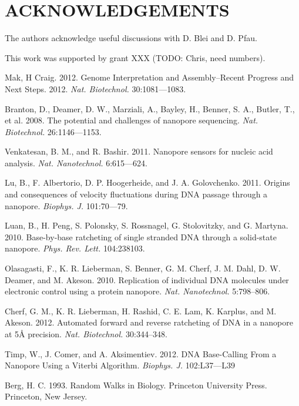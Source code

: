\documentclass{biophys_letter}
\begin{document}
\section*{ACKNOWLEDGEMENTS}

The authors acknowledge useful discussions with D. Blei and D. Pfau.

This work was supported by grant XXX (TODO: Chris, need numbers).

\begin{thebibliography}{99}

  Mak, H Craig. 
  2012.
  Genome Interpretation and Assembly--Recent Progress and Next Steps.
  2012.
  {\it Nat. Biotechnol.}
  30:1081---1083.

  Branton, D., Deamer, D. W., Marziali, A., Bayley, H., Benner, S. A., Butler, T., et al.
  2008.
  The potential and challenges of nanopore sequencing.
  {\it Nat. Biotechnol.}
  26:1146---1153.

  Venkatesan, B. M., and R. Bashir.
  2011.
  Nanopore sensors for nucleic acid analysis.
  {\it Nat. Nanotechnol.}
  6:615---624.

  Lu, B., F. Albertorio, D. P. Hoogerheide, and J. A. Golovchenko.
  2011.
  Origins and consequences of velocity fluctuations during DNA passage through a nanopore.
  {\it Biophys. J.}
  101:70---79.

  Luan, B., H. Peng, S. Polonsky, S. Rossnagel, G. Stolovitzky, and G. Martyna.
  2010.
  Base-by-base ratcheting of single stranded DNA through a solid-state nanopore.
  {\it Phys. Rev. Lett.}
  104:238103.

  Olasagasti, F., K. R. Lieberman, S. Benner, G. M. Cherf, J. M. Dahl, D. W. Deamer, and M. Akeson.
  2010.
  Replication of individual DNA molecules under electronic control using a protein nanopore.
  {\it Nat. Nanotechnol.}
  5:798--806.

  Cherf, G. M., K. R. Lieberman, H. Rashid, C. E. Lam, K. Karplus, and M. Akeson.
  2012.
  Automated forward and reverse ratcheting of DNA in a nanopore at 5{\AA} precision.
  {\it Nat. Biotechnol.}
  30:344--348.

  Timp, W., J. Comer, and A. Aksimentiev. 
  2012.
  DNA Base-Calling From a Nanopore Using a Viterbi Algorithm.
  {\it Biophys. J.}
  102:L37---L39

  Berg, H. C.
  1993.
  Random Walks in Biology.
  Princeton University Press.
  Princeton, New Jersey.


\end{thebibliography}
\end{document}
